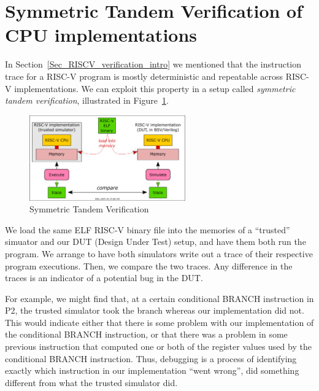 
\section{Symmetric Tandem Verification of CPU implementations}

\label{Sec_Symmetric_Tandem_Verification}


In Section~\ref{Sec_RISCV_verification_intro} we mentioned that the
instruction trace for a RISC-V program is mostly deterministic and
repeatable across RISC-V implementations.  We can exploit this
property in a setup called \emph{symmetric tandem verification},
illustrated in Figure~\ref{Fig_tandem_verification}.
\begin{figure}[htbp]
  \centerline{\includegraphics[width=0.6\textwidth,angle=0]
                              {Figures/RSN_2025-10-15.001.00_Symmetric_Tandem_Verification}}
  \caption{\label{Fig_tandem_verification}
                  Symmetric Tandem Verification}
\end{figure}

We load the same ELF RISC-V binary file into the memories of a
``trusted'' simuator and our DUT (Design Under Test) setup, and have
them both run the program.  We arrange to have both simulators write
out a trace of their respective program executions.  Then, we compare
the two traces. Any difference in the traces is an indicator of a
potential bug in the DUT.

For example, we might find that, at a certain conditional BRANCH
instruction in P2, the trusted simulator took the branch whereas our
implementation did not.  This would indicate either that there is some
problem with our implementation of the conditional BRANCH instruction,
or that there was a problem in some previous instruction that computed
one or both of the register values used by the conditional BRANCH
instruction.  Thus, debugging is a process of identifying exactly
which instruction in our implementation ``went wrong'', {\ie} did
something different from what the trusted simulator did.

